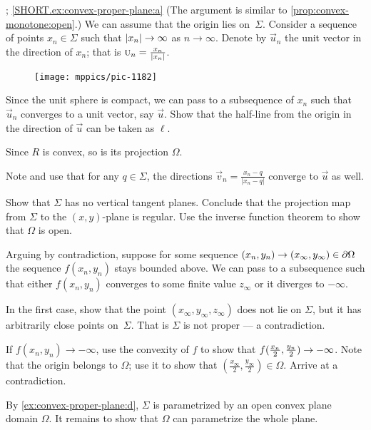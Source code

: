 \begin{multicols}{2}
\parbf{\ref{ex:convex-proper-plane}}; \ref{SHORT.ex:convex-proper-plane:a}
(The argument is similar to \ref{prop:convex-monotone:open}.)
We can assume that the origin lies on~$\Sigma$.
Consider a sequence of points $x_n\in \Sigma$ such that $|x_n|\z\to \infty$ as $n\to \infty$.
Denote by $\vec u_n$ the unit vector in the direction of $x_n$; that is $\vec u_n\z=\tfrac{x_n}{|x_n|}$.

\begin{wrapfigure}{r}{29 mm}
\vskip-4mm
\centering
\texttt{[image: mppics/pic-1182]}
\vskip-3mm
\end{wrapfigure}

Since the unit sphere is compact, we can pass to a subsequence of $x_n$ such that $\vec u_n$ converges to a unit vector, say $\vec u$.
Show that the half-line from the origin in the direction of $\vec u$ can be taken as $\ell$.

Since $R$ is convex, so is its projection $\Omega$.

Note and use that for any $q\in \Sigma$, the directions $\vec v_n=\tfrac{x_n-q}{|x_n-q|}$ converge to $\vec u$ as well.

Show that $\Sigma$ has no vertical tangent planes.
Conclude that the projection map from $\Sigma$ to the $(x,y)$-plane is regular.
Use the inverse function theorem to show that $\Omega$ is open.


Arguing by contradiction, suppose for some sequence $(x_n,y_n)\z\to(x_\infty,y_\infty)\in \partial\Omega$ the sequence $f(x_n,y_n)$ stays bounded above.
We can pass to a subsequence such that either $f(x_n,y_n)$ converges to some finite value $z_\infty$ or it diverges to $-\infty$.

In the first case, show that the point $(x_\infty, y_\infty,z_\infty)$ does not lie on $\Sigma$, but it has arbitrarily close points on~$\Sigma$.
That is $\Sigma$ is not proper --- a contradiction.

If $f(x_n,y_n)\to -\infty$, use the convexity of $f$ to show that $f(\tfrac{x_n}2 ,\tfrac{y_n}2)\z\to -\infty$.
Note that the origin belongs to $\Omega$;
use it to show that $(\tfrac{x_\infty}2, \tfrac{y_\infty}2)\in\Omega$.
Arrive at a contradiction.

By \ref{ex:convex-proper-plane:d}, $\Sigma$ is parametrized by an open convex plane domain $\Omega$.
It remains to show that $\Omega$ can parametrize the whole plane.


\end{multicols}
